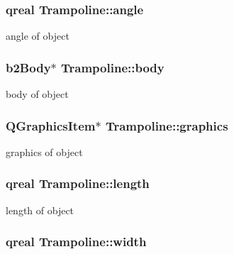 \subsubsection[{\texorpdfstring{angle}{angle}}]{\setlength{\rightskip}{0pt plus 5cm}qreal Trampoline\+::angle}\hypertarget{class_trampoline_ae2b2f0ba18c591bbcf360f368758edf7}{}\label{class_trampoline_ae2b2f0ba18c591bbcf360f368758edf7}


angle of object 

\subsubsection[{\texorpdfstring{body}{body}}]{\setlength{\rightskip}{0pt plus 5cm}b2\+Body$\ast$ Trampoline\+::body}\hypertarget{class_trampoline_a5640097c2fa1b82b69338e3e3d5fc18e}{}\label{class_trampoline_a5640097c2fa1b82b69338e3e3d5fc18e}


body of object 

\subsubsection[{\texorpdfstring{graphics}{graphics}}]{\setlength{\rightskip}{0pt plus 5cm}Q\+Graphics\+Item$\ast$ Trampoline\+::graphics}\hypertarget{class_trampoline_a889e4c0143c14b47dc7575395356560a}{}\label{class_trampoline_a889e4c0143c14b47dc7575395356560a}


graphics of object 

\subsubsection[{\texorpdfstring{length}{length}}]{\setlength{\rightskip}{0pt plus 5cm}qreal Trampoline\+::length}\hypertarget{class_trampoline_afc20b8e85af09d551c0278b2dcc1d35d}{}\label{class_trampoline_afc20b8e85af09d551c0278b2dcc1d35d}


length of object 

\subsubsection[{\texorpdfstring{width}{width}}]{\setlength{\rightskip}{0pt plus 5cm}qreal Trampoline\+::width}\hypertarget{class_trampoline_abc6d02536d9caeb1c1d80c545ebae044}{}\label{class_trampoline_abc6d02536d9caeb1c1d80c545ebae044}


